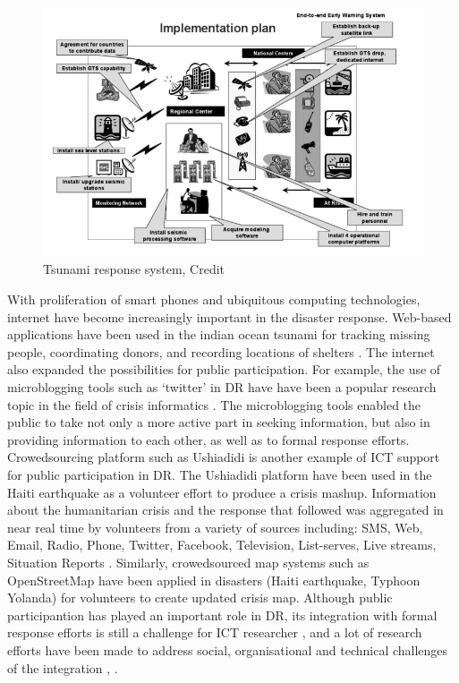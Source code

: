 \begin{figure}[h]
  \centering
  \includegraphics[width=1\textwidth]{img/Background/ICTExample}
  \caption{Tsunami response system, Credit \cite{Wattegama2012} }
  \label{fig:ICTExample}
\end{figure}

With proliferation of smart phones and ubiquitous computing technologies, internet have become increasingly important in the disaster response. Web-based applications have been used in the indian ocean tsunami for tracking missing people, coordinating donors, and recording locations of shelters \cite{Wattegama2012}. The internet also expanded the possibilities for public participation. For example, the use of microblogging tools such as `twitter' in \ac{DR} have have been a popular research topic in the field of crisis informatics \cite{Kogan2012,Sarcevic2012,Starbird2010}.  The microblogging tools enabled the public to take not only a more active part in seeking information, but also in providing information to each other, as well as to formal response efforts. Crowedsourcing platform such as Ushiadidi \cite{Morrow2011} is another example of \ac{ICT} support for public participation in \ac{DR}. The Ushiadidi platform have been used in the Haiti earthquake as a volunteer effort to produce a crisis mashup. Information about the humanitarian crisis and the response that followed was aggregated in near real time by volunteers from a variety of sources including: SMS, Web, Email, Radio, Phone, Twitter, Facebook, Television, List-serves, Live streams, Situation Reports \cite{Morrow2011}. Similarly, crowedsourced map systems such as OpenStreetMap \cite{Palen2015} have been applied in disasters (Haiti earthquake, Typhoon Yolanda) for volunteers to create updated crisis map. Although public participantion has played an important role in \ac{DR}, its integration with formal response efforts is still a challenge for \ac{ICT} researcher \cite{Palen2007}, and a lot of research efforts have been made to address social, organisational and technical challenges of the integration \cite{Dashti2014}, \cite{Sutton2008}.   \\

